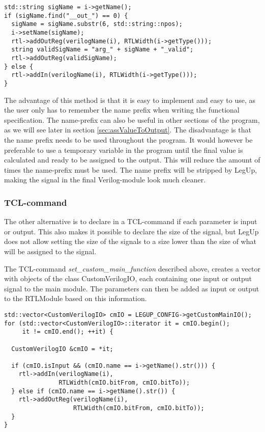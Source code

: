 \begin{lstlisting}
std::string sigName = i->getName();
if (sigName.find("__out_") == 0) {
  sigName = sigName.substr(6, std::string::npos);
  i->setName(sigName);
  rtl->addOutReg(verilogName(i), RTLWidth(i->getType()));
  string validSigName = "arg_" + sigName + "_valid";
  rtl->addOutReg(validSigName);
} else {
  rtl->addIn(verilogName(i), RTLWidth(i->getType())); 
}
\end{lstlisting}
The advantage of this method is that it is easy to implement and easy to use, as the user only has to remember the name prefix when writing the functional specification. The name-prefix can also be useful in other sections of the program, as we will see later in section \ref{sec:assValueToOutput}. The disadvantage is that the name prefix needs to be used throughout the program. It would however be preferable to use a temporary variable in the program until the final value is calculated and ready to be assigned to the output. This will reduce the amount of times the name-prefix must be used.
The name prefix will be stripped by LegUp, making the signal in the final Verilog-module look much cleaner.
\subsubsection{\label{subsubsec:inoutparameter}TCL-command}
The other alternative is to declare in a TCL-command if each parameter is input or output. This also makes it possible to declare the size of the signal, but LegUp does not allow setting the size of the signals to a size lower than the size of what will be assigned to the signal.

The TCL-command \textit{set\_custom\_main\_function} described above, creates a vector with objects of the class CustomVerilogIO, each containing one input or output signal to the main module. The parameters can then be added as input or output to the RTLModule based on this information.
\begin{lstlisting}
std::vector<CustomVerilogIO> cmIO = LEGUP_CONFIG->getCustomMainIO();
for (std::vector<CustomVerilogIO>::iterator it = cmIO.begin();
     it != cmIO.end(); ++it) {

  CustomVerilogIO &cmIO = *it;

  if (cmIO.isInput && (cmIO.name == i->getName().str())) {
    rtl->addIn(verilogName(i),
               RTLWidth(cmIO.bitFrom, cmIO.bitTo));
  } else if (cmIO.name == i->getName().str()) {
    rtl->addOutReg(verilogName(i),
                   RTLWidth(cmIO.bitFrom, cmIO.bitTo));
  }
}
\end{lstlisting}

